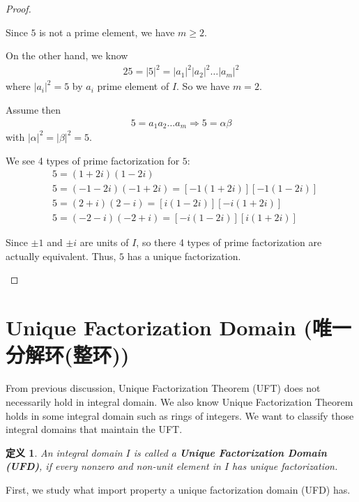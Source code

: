 \documentclass[utf8]{ctexbook}
\newtheorem{definition}{定义}[section]
\begin{document}
\begin{proof}
\begin{enumerate}
\begin{itemize}
{Since $5$ is not a prime element, we have $m \geq 2$.

On the other hand, we know
\begin{align*}
25 = |5|^2 = |a_1|^2 |a_2|^2 \ldots |a_m|^2
\end{align*}
where $|a_i|^2 =5$ by $a_i$ prime element of $I$. So we have $m=2$.

Assume then
\begin{align*}
5 = a_1 a_2 \ldots a_m \Longrightarrow 5 = \alpha \beta
\end{align*} 
with $|\alpha|^2 =  | \beta |^2 = 5$.

We see 4 types of prime factorization for $5$:
\begin{align*}
& 5 = (1 + 2i) (1 - 2i) \\
& 5 = (-1 - 2i) (-1 + 2i) = [ -1 (1 + 2i) ] [-1 (1 - 2i ) ] \\
& 5 = ( 2 + i ) ( 2 - i) = [ i (1- 2i) ] [ -i ( 1 + 2i) ]\\
& 5 = ( -2 - i ) (-2 + i) = [ -i ( 1 - 2i) ] [ i ( 1 + 2i ) ]
\end{align*} 

Since $\pm 1$ and $\pm i$ are units of $I$, so there 4 types of prime factorization are actually equivalent. Thus, $5$ has a unique factorization.
}
\end{itemize}

\end{enumerate}


\end{proof}

\section{Unique Factorization Domain (唯一分解环(整环))}

From previous discussion, Unique Factorization Theorem (UFT) does not necessarily hold in integral domain. We also know Unique Factorization Theorem holds in some integral domain such as rings of integers. We want to classify those integral domains that maintain the UFT.

\begin{definition}
An integral domain $I$ is called a \textbf{Unique Factorization Domain (UFD)}, if every nonzero and non-unit element in $I$ has unique factorization.
\end{definition}

First, we study what import property a unique factorization domain (UFD) has.
\end{document}
